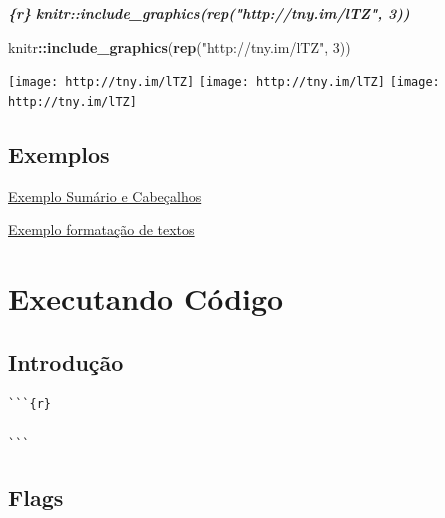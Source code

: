 \documentclass[
]{book}
\newenvironment{Shaded}{\begin{snugshade}}{\end{snugshade}}
\newcommand{\DecValTok}[1]{\textcolor[rgb]{0.00,0.00,0.81}{#1}}
\newcommand{\InformationTok}[1]{\textcolor[rgb]{0.56,0.35,0.01}{\textbf{\textit{#1}}}}
\newcommand{\KeywordTok}[1]{\textcolor[rgb]{0.13,0.29,0.53}{\textbf{#1}}}
\newcommand{\NormalTok}[1]{#1}
\newcommand{\OperatorTok}[1]{\textcolor[rgb]{0.81,0.36,0.00}{\textbf{#1}}}
\newcommand{\StringTok}[1]{\textcolor[rgb]{0.31,0.60,0.02}{#1}}
\begin{document}
\begin{Shaded}
\begin{Highlighting}[]
\InformationTok{\textasciigrave{}\textasciigrave{}\textasciigrave{}\{r\}}
\InformationTok{knitr::include\_graphics(rep("http://tny.im/lTZ", 3))}
\InformationTok{\textasciigrave{}\textasciigrave{}\textasciigrave{}}
\end{Highlighting}
\end{Shaded}

\begin{Shaded}
\begin{Highlighting}[]
\NormalTok{knitr}\OperatorTok{::}\KeywordTok{include\_graphics}\NormalTok{(}\KeywordTok{rep}\NormalTok{(}\StringTok{"http://tny.im/lTZ"}\NormalTok{, }\DecValTok{3}\NormalTok{))}
\end{Highlighting}
\end{Shaded}

\texttt{[image: http://tny.im/lTZ]} \texttt{[image: http://tny.im/lTZ]} \texttt{[image: http://tny.im/lTZ]}

\hypertarget{exemplos}{%
\section{Exemplos}\label{exemplos}}

\href{exemplos/102-sumario_e_cabecalho.html}{Exemplo Sumário e Cabeçalhos}

\href{exemplos/103-formatacao_de_texto.html}{Exemplo formatação de textos}

\hypertarget{executando-cuxf3digo}{%
\chapter{Executando Código}\label{executando-cuxf3digo}}

\hypertarget{introduuxe7uxe3o}{%
\section{Introdução}\label{introduuxe7uxe3o}}

\begin{verbatim}
```{r}

```
\end{verbatim}

\hypertarget{flags}{%
\section{Flags}\label{flags}}
\end{document}
